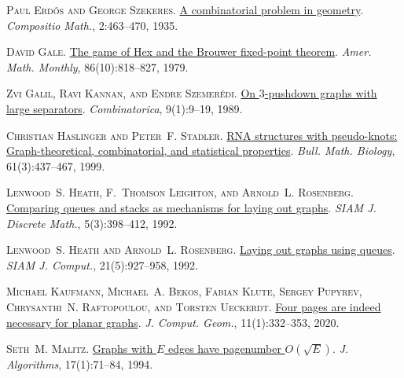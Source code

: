 \documentclass[kpfonts]{patmorin}
\begin{document}
	\textsc{Paul Erd\H{o}s and George Szekeres}.
	\newblock \href{http://www.numdam.org/item?id=CM_1935__2__463_0}{A
		combinatorial problem in geometry}.
	\newblock \emph{Compositio Math.}, 2:463--470, 1935.
	
	\textsc{David Gale}.
	\newblock \href{https://doi.org/10.2307/2320146}{The game of {H}ex and the
		{B}rouwer fixed-point theorem}.
	\newblock \emph{Amer. Math. Monthly}, 86(10):818--827, 1979.
	
	\textsc{Zvi Galil, Ravi Kannan, and Endre Szemer\'{e}di}.
	\newblock \href{https://doi.org/10.1007/BF02122679}{On $3$-pushdown graphs with
		large separators}.
	\newblock \emph{Combinatorica}, 9(1):9--19, 1989.
	
	\textsc{Christian Haslinger and Peter~F. Stadler}.
	\newblock \href{https://doi.org/10.1006/bulm.1998.0085}{{RNA} structures with
		pseudo-knots: {G}raph-theoretical, combinatorial, and statistical
		properties}.
	\newblock \emph{Bull. Math. Biology}, 61(3):437--467, 1999.
	
	\textsc{Lenwood~S. Heath, F.~Thomson Leighton, and Arnold~L. Rosenberg}.
	\newblock \href{https://doi.org/10.1137/0405031}{Comparing queues and stacks as
		mechanisms for laying out graphs}.
	\newblock \emph{SIAM J. Discrete Math.}, 5(3):398--412, 1992.
	
	\textsc{Lenwood~S. Heath and Arnold~L. Rosenberg}.
	\newblock \href{https://doi.org/10.1137/0221055}{Laying out graphs using
		queues}.
	\newblock \emph{SIAM J. Comput.}, 21(5):927--958, 1992.
	
	\textsc{Michael Kaufmann, Michael~A. Bekos, Fabian Klute, Sergey Pupyrev,
		Chrysanthi~N. Raftopoulou, and Torsten Ueckerdt}.
	\newblock
	\href{https://doi.org/10.20382/jocg.v11i1a12}{Four
		pages are indeed necessary for planar graphs}.
	\newblock \emph{J. Comput. Geom.}, 11(1):332--353, 2020.
	
	\textsc{Seth~M. Malitz}.
	\newblock \href{https://doi.org/10.1006/jagm.1994.1027}{Graphs with ${E}$ edges
		have pagenumber ${O}(\sqrt {E})$}.
	\newblock \emph{J. Algorithms}, 17(1):71--84, 1994.
	
\end{document}

